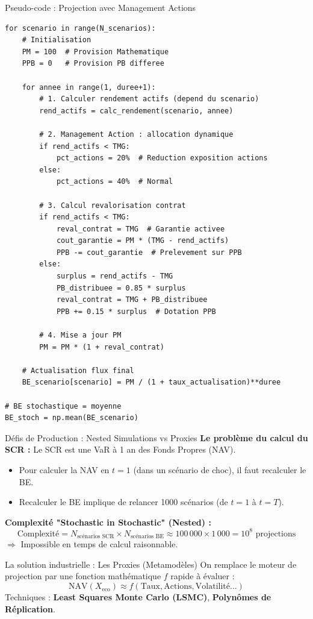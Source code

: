 \documentclass[10pt,aspectratio=169]{beamer}
\begin{document}
\begin{frame}[fragile]{Pseudo-code : Projection avec Management Actions}
\begin{lstlisting}[style=pythonstyle, basicstyle=\ttfamily\tiny]
for scenario in range(N_scenarios):
    # Initialisation
    PM = 100  # Provision Mathematique
    PPB = 0   # Provision PB differee
    
    for annee in range(1, duree+1):
        # 1. Calculer rendement actifs (depend du scenario)
        rend_actifs = calc_rendement(scenario, annee)
        
        # 2. Management Action : allocation dynamique
        if rend_actifs < TMG:
            pct_actions = 20%  # Reduction exposition actions
        else:
            pct_actions = 40%  # Normal
        
        # 3. Calcul revalorisation contrat
        if rend_actifs < TMG:
            reval_contrat = TMG  # Garantie activee
            cout_garantie = PM * (TMG - rend_actifs)
            PPB -= cout_garantie  # Prelevement sur PPB
        else:
            surplus = rend_actifs - TMG
            PB_distribuee = 0.85 * surplus
            reval_contrat = TMG + PB_distribuee
            PPB += 0.15 * surplus  # Dotation PPB
        
        # 4. Mise a jour PM
        PM = PM * (1 + reval_contrat)
    
    # Actualisation flux final
    BE_scenario[scenario] = PM / (1 + taux_actualisation)**duree

# BE stochastique = moyenne
BE_stoch = np.mean(BE_scenario)
\end{lstlisting}
\end{frame}

\begin{frame}{Défis de Production : Nested Simulations vs Proxies}
\textbf{Le problème du calcul du SCR :}
Le SCR est une VaR à 1 an des Fonds Propres (NAV).
\begin{itemize}
    \item Pour calculer la NAV en $t=1$ (dans un scénario de choc), il faut recalculer le BE.
    \item Recalculer le BE implique de relancer 1000 scénarios (de $t=1$ à $t=T$).
\end{itemize}

\vspace{0.2cm}
\textbf{Complexité "Stochastic in Stochastic" (Nested) :}
\[ \text{Complexité} = N_{\text{scénarios SCR}} \times N_{\text{scénarios BE}} \approx 100\,000 \times 1\,000 = 10^8 \text{ projections} \]
$\Rightarrow$ \alert{Impossible} en temps de calcul raisonnable.

\vspace{0.3cm}
\begin{block}{La solution industrielle : Les Proxies (Metamodèles)}
On remplace le moteur de projection par une fonction mathématique $f$ rapide à évaluer :
\[ \text{NAV}(X_{\text{eco}}) \approx f(\text{Taux}, \text{Actions}, \text{Volatilité}...) \]
Techniques : \textbf{Least Squares Monte Carlo (LSMC)}, \textbf{Polynômes de Réplication}.
\end{block}
\end{frame}
\end{document}
